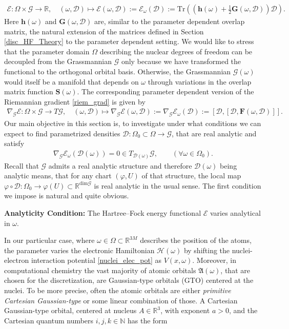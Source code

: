\documentclass[reqno]{amsart}
\begin{document}
\begin{align}\label{param_ene_func}
    \mathcal{E}:\Omega\times \mathcal{G}\longrightarrow \mathbb{R}, \quad (\omega, \mathscr{D})\mapsto \mathcal{E}(\omega,\mathscr{D}):=\mathcal{E}_\omega(\mathscr{D}):= \text{Tr}((\mathbf{h}(\omega)+\tfrac{1}{2}\mathbf{G}(\omega,\mathscr{D}))\mathscr{D}).
\end{align}
Here $\mathbf{h}(\omega)$ and $\mathbf{G}(\omega,\mathscr{D})$ are, similar to the parameter dependent overlap matrix, the natural extension of the matrices defined in Section \ref{disc_HF_Theory} to the parameter dependent setting. We would like to stress that the parameter domain $\Omega$ describing the nuclear degrees of freedom can be decoupled from the Grassmannian $\mathcal{G}$ only because we have transformed the functional to the orthogonal orbital basis. Otherwise, the Grassmannian $\mathcal{G}(\omega)$ would itself be a manifold that depends on $\omega$ through variations in the overlap matrix function $\mathbf{S}(\omega)$. The corresponding parameter dependent version of the Riemannian gradient \eqref{riem_grad} is given by
\begin{align}\label{param_grad}
    \nabla_\mathcal{G}\mathcal{E}:\Omega\times \mathcal{G}\longrightarrow T\mathcal{G},\quad (\omega,\mathscr{D})\mapsto \nabla_\mathcal{G}\mathcal{E}(\omega,\mathscr{D}):=\nabla_\mathcal{G}\mathcal{E}_\omega (\mathscr{D}):=[\mathscr{D},[\mathscr{D},\mathbf{F}(\omega,\mathscr{D})]].
\end{align}
Our main objective in this section is, to investigate under what conditions we can expect to find parametrized densities  $\mathscr{D}:\Omega_0\subset \Omega\longrightarrow \mathcal{G}$, that are real analytic and satisfy
\begin{align*}
    \nabla_\mathcal{G}\mathcal{E}_\omega(\mathscr{D}(\omega))=0\in T_{\mathscr{D}(\omega)}\mathcal{G}, \qquad (\forall \omega\in \Omega_0).
\end{align*}
Recall that $\mathcal{G}$ admits a real analytic structure and therefore $\mathscr{D}(\omega)$ being analytic means, that for any chart $(\varphi,U)$ of that structure, the local map $\varphi \circ \mathscr{D}:\Omega_0 \longrightarrow \varphi(U) \subset \mathbb{R}^{\text{dim}\mathcal{G}}$ is real analytic in the usual sense.
The first condition we impose is natural and quite obvious.
\begin{framed}
\textbf{Analyticity Condition:} The Hartree–Fock energy functional $\mathcal{E}$ varies analytical in $\omega$.
\end{framed}In our particular case, where $\omega \in \Omega \subset \mathbb{R}^{3M}$ describes the position of the atoms, the parameter varies the electronic Hamiltonian $\mathcal{H}(\omega)$ by shifting the nuclei-electron interaction potential \eqref{nuclei_elec_pot} as $V(x,\omega)$. Moreover, in computational chemistry the vast majority of atomic orbitals $\mathfrak{A}(\omega)$, that are chosen for the discretization, are Gaussian-type orbitals (GTO) centered at the nuclei. To be more precise, often the atomic orbitals are either \textit{primitive Cartesian Gaussian-type} or some linear combination of those. A Cartesian Gaussian-type orbital, centered at nucleus $A\in \mathbb{R}^{3}$, with exponent $a>0$, and the Cartesian quantum numbers $i,j,k\in \mathbb{N}$ has the form
\end{document}
